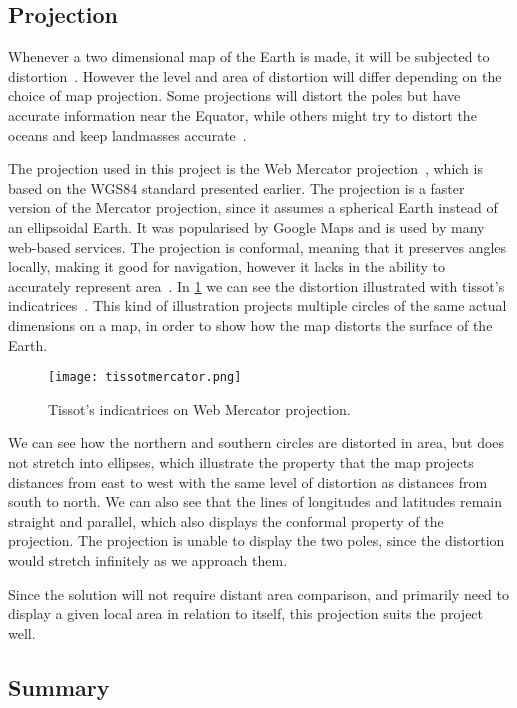 \subsection{Projection}

Whenever a two dimensional map of the Earth is made, it will be subjected to distortion~\cite{projectionalbum}. However the level and area of distortion will differ depending on the choice of map projection. Some projections will distort the poles but have accurate information near the Equator, while others might try to distort the oceans and keep landmasses accurate~\cite{website:Wikipedia-mapprojections}.

The projection used in this project is the Web Mercator projection~\cite{webmercator}, which is based on the WGS84 standard presented earlier. The projection is a faster version of the Mercator projection, since it assumes a spherical Earth instead of an ellipsoidal Earth. It was popularised by Google Maps and is used by many web-based services. The projection is conformal, meaning that it preserves angles locally, making it good for navigation, however it lacks in the ability to accurately represent area~\cite{mercatorcritique}. In \cref{tissots} we can see the distortion illustrated with tissot's indicatrices~\cite{tissot}. This kind of illustration projects multiple circles of the same actual dimensions on a map, in order to show how the map distorts the surface of the Earth.

\begin{figure}[htbp]
    \centering
\texttt{[image: tissotmercator.png]}
\caption{Tissot's indicatrices on Web Mercator projection.}
\label{tissots}
\end{figure}

We can see how the northern and southern circles are distorted in area, but does not stretch into ellipses, which illustrate the property that the map projects distances from east to west with the same level of distortion as distances from south to north. We can also see that the lines of longitudes and latitudes remain straight and parallel, which also displays the conformal property of the projection. The projection is unable to display the two poles, since the distortion would stretch infinitely as we approach them.

Since the solution will not require distant area comparison, and primarily need to display a given local area in relation to itself, this projection suits the project well.


\subsection{Summary}

